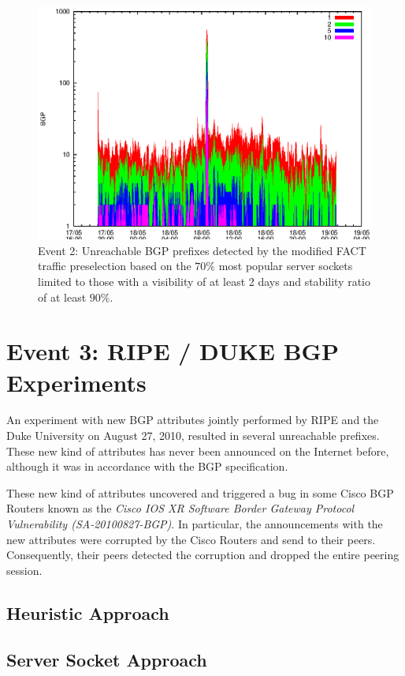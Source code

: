 \begin{figure}
	[ht] \centering 
	\includegraphics[width=0.75\linewidth]{images/events/2010_05_18/bgp_log_Set_var_0_1_stab_9_vts_2.eps}
	\caption{Event 2: Unreachable BGP prefixes detected by the modified FACT traffic preselection based on the $70\%$ most popular server sockets limited to those with a visibility of at least 2 days and stability ratio of at least $90\%$.} 
	\label{fig:TIER1_FACT_popularVTS2STAB9} 
\end{figure}


\newpage
\section{Event 3: RIPE / DUKE BGP Experiments}


An experiment with new BGP attributes jointly performed by RIPE and the Duke 
University on August 27, 2010, resulted in several unreachable prefixes\citep{SchatzmannPAM2011}. These 
new kind of attributes has never been announced on the Internet before,  
although it was in accordance with the BGP specification\citep{ripe_duke}.

These new kind of attributes uncovered and triggered a bug in some Cisco BGP 
Routers known as the \emph{Cisco IOS XR Software Border Gateway Protocol Vulnerability (SA-20100827-BGP)}\citep{cisco_vulnerability}. In particular, the announcements with the new attributes were corrupted 
by the Cisco Routers and send to their peers. Consequently, their peers detected 
the corruption and dropped the entire peering session\citep{ripe_duke}.


\subsection{Heuristic Approach}

\subsection{Server Socket Approach}

